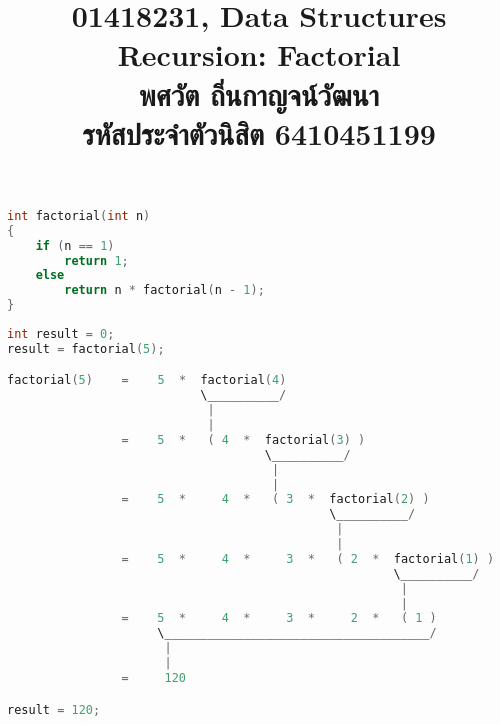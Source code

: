 \documentclass{article}
\title{\flushleft\normalsize 01418231, Data Structures\\
\LARGE \textbf{Recursion}: Factorial\\
\vspace{2ex}
\normalsize พศวัต ถิ่นกาญจน์วัฒนา\\
รหัสประจำตัวนิสิต 6410451199
\vspace{-12ex}}
\author{}
\date{}
\begin{document}
\maketitle
\sloppy\flushleft


\begin{minipage}[t]{\textwidth}
\begin{lstlisting}[language=C,caption=The Factorial Function]
int factorial(int n)
{
    if (n == 1)
        return 1;
    else
        return n * factorial(n - 1);
}
\end{lstlisting}
\end{minipage}

\rule{0em}{5ex}

\begin{lstlisting}[language=C,numbers=none,frame=none]
int result = 0;
result = factorial(5);

factorial(5)    =    5  *  factorial(4)
                           \__________/
                            |
                            |
                =    5  *   ( 4  *  factorial(3) )
                                    \__________/
                                     |
                                     |
                =    5  *     4  *   ( 3  *  factorial(2) )
                                             \__________/
                                              |
                                              |
                =    5  *     4  *     3  *   ( 2  *  factorial(1) )
                                                      \__________/
                                                       |
                                                       |
                =    5  *     4  *     3  *     2  *   ( 1 )
                     \_____________________________________/
                      |
                      |
                =     120

result = 120;
\end{lstlisting}
\end{document}
